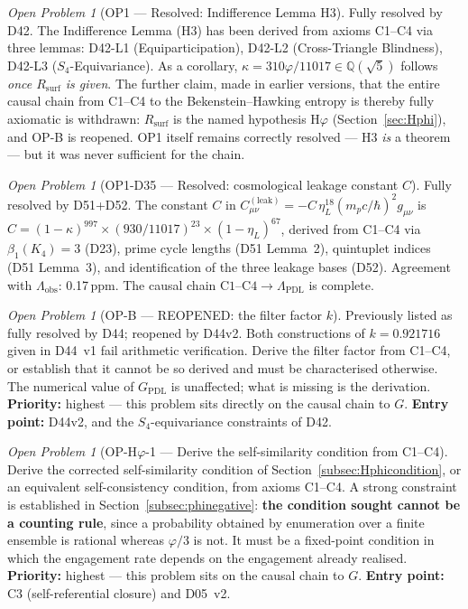 \documentclass[11pt,a4paper]{article}
\theoremstyle{plain}
\theoremstyle{definition}
\theoremstyle{remark}
\newtheorem{openproblem}[theorem]{Open Problem}
\newcommand{\Rsurf}{R_{\mathrm{surf}}}
\begin{document}
\begin{openproblem}[OP1 --- Resolved: Indifference Lemma H3]
\label{op:H3}
\textcolor{proofblue}{Fully resolved by D42.} The Indifference Lemma (H3) has been derived from axioms C1--C4 via three lemmas: D42-L1 (Equiparticipation), D42-L2 (Cross-Triangle Blindness), D42-L3 ($S_4$-Equivariance). As a corollary, $\kappa=310\varphi/11017\in\mathbb{Q}(\sqrt{5})$ follows \emph{once $\Rsurf$ is given}. \textcolor{negativered}{The further claim, made in earlier versions, that the entire causal chain from C1--C4 to the Bekenstein--Hawking entropy is thereby fully axiomatic is withdrawn: $\Rsurf$ is the named hypothesis H$\varphi$ (Section~\ref{sec:Hphi}), and OP-B is reopened. OP1 itself remains correctly resolved --- H3 \emph{is} a theorem --- but it was never sufficient for the chain.}
\end{openproblem}

\begin{openproblem}[OP1-D35 --- Resolved: cosmological leakage constant $C$]
\label{op:leakconstant}
\textcolor{proofblue}{Fully resolved by D51+D52.} The constant $C$ in $C^{(\mathrm{leak})}_{\mu\nu}=-C\,\eta_L^{18}(m_p c/\hbar)^2 g_{\mu\nu}$ is $C=(1-\kappa)^{997}\times(930/11017)^{23}\times(1-\eta_L)^{67}$, derived from C1--C4 via $\beta_1(K_4)=3$ (D23), prime cycle lengths (D51 Lemma~2), quintuplet indices (D51 Lemma~3), and identification of the three leakage bases (D52). Agreement with $\Lambda_{\mathrm{obs}}$: 0.17\,ppm. The causal chain $\mathrm{C1\text{--}C4}\to\Lambda_{\mathrm{PDL}}$ is complete.
\end{openproblem}

\begin{openproblem}[OP-B --- REOPENED: the filter factor $k$]
\label{op:OPB}
\textcolor{negativered}{Previously listed as fully resolved by D44; reopened by D44v2.} Both constructions of $k=0.921716$ given in D44~v1 fail arithmetic verification. Derive the filter factor from C1--C4, or establish that it cannot be so derived and must be characterised otherwise. The numerical value of $G_{\mathrm{PDL}}$ is unaffected; what is missing is the derivation. \textbf{Priority:} highest --- this problem sits directly on the causal chain to $G$. \textbf{Entry point:} D44v2, and the $S_4$-equivariance constraints of D42.
\end{openproblem}

\begin{openproblem}[OP-H$\varphi$-1 --- Derive the self-similarity condition from C1--C4]
\label{op:Hphi1}
Derive the corrected self-similarity condition of Section~\ref{subsec:Hphicondition}, or an equivalent self-consistency condition, from axioms C1--C4. A strong constraint is established in Section~\ref{subsec:phinegative}: \textbf{the condition sought cannot be a counting rule}, since a probability obtained by enumeration over a finite ensemble is rational whereas $\varphi/3$ is not. It must be a fixed-point condition in which the engagement rate depends on the engagement already realised. \textbf{Priority:} highest --- this problem sits on the causal chain to $G$. \textbf{Entry point:} C3 (self-referential closure) and D05~v2.
\end{openproblem}
\end{document}
